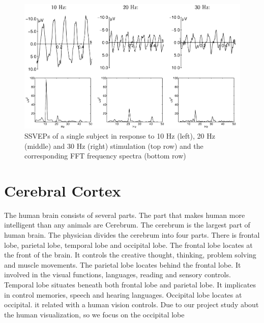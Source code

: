 \begin{figure}[ht]
	\centering
	\includegraphics[scale = 0.21]{chapter2/26.pdf}
	\caption{SSVEPs of a single subject in response to 10 Hz (left), 20 Hz (middle) and 30 Hz (right) stimulation (top row) and the corresponding FFT frequency spectra (bottom row)}
\end{figure}

\section{Cerebral Cortex}

\hspace{1.5cm} The human brain consists of several parts. The part that makes human more intelligent than any animals are Cerebrum. The cerebrum is the largest part of human brain. The physician divides the cerebrum into four parts. There is frontal lobe, parietal lobe, temporal lobe and occipital lobe. The frontal lobe locates at the front of the brain. It controls the creative thought, thinking, problem solving and muscle movements. The parietal lobe locates behind the frontal lobe. It involved in the visual functions, languages, reading and sensory controls. Temporal lobe situates beneath both frontal lobe and parietal lobe. It implicates in control memories, speech and hearing languages. Occipital lobe locates at occipital. it related with a human vision controls. Due to our project study about the human visualization, so we focus on the occipital lobe

